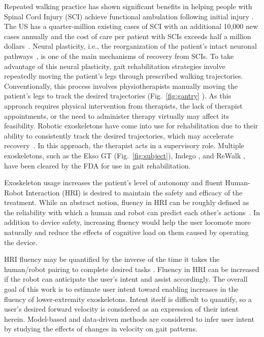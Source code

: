 Repeated walking practice has shown significant benefits in helping people with Spinal Cord Injury (SCI) achieve functional ambulation following initial injury \cite{lam2007systematic}. The US has a quarter-million existing cases of SCI with an additional 10,000 new cases annually \cite{nih} and the cost of care per patient with SCIs exceeds half a million dollars~\cite{devivo2011costs}. Neural plasticity, i.e., the reorganization of the patient's intact neuronal pathways~\cite{curt2008recovery}, is one of the main mechanisms of recovery from SCIs. To take advantage of this neural plasticity, gait rehabilitation strategies involve repeatedly moving the patient's legs through prescribed walking trajectories. Conventionally, this process involves physiotherapists manually moving the patient's legs to track the desired trajectories (Fig.~\ref{fig:gantry} \cite{gaitrehabgantry}). %
As this approach requires physical intervention from therapists, the lack of therapist appointments, or the need to administer therapy virtually may affect its feasibility. Robotic exoskeletons have come into use for rehabilitation due to their ability to consistently track the desired trajectories, which may accelerate recovery~\cite{hidler2011role}. In this approach, the therapist acts in a supervisory role. Multiple exoskeletons, such as the Ekso GT \cite{brenner2016exploring} (Fig.~\ref{fig:subject}), Indego \cite{sup2008design}, and ReWalk \cite{rewalk}, have been cleared by the FDA for use in gait rehabilitation.

Exoskeleton usage increases the patient's level of autonomy and fluent Human-Robot Interaction (HRI) is desired to maintain the safety and efficacy of the treatment. While an abstract notion, fluency in HRI can be roughly defined as the reliability with which a human and robot can predict each other's actions~\cite{hoffman2007cost}. In addition to device safety, increasing fluency would help the user locomote more naturally and reduce the effects of cognitive load \cite{bogen2018walk} on them caused by operating the device.

HRI fluency may be quantified by the inverse of the time it takes the human/robot pairing to complete desired tasks \cite{hoffman2019evaluating}. Fluency in HRI can be increased if the robot can anticipate the user's intent and assist accordingly. The overall goal of this work is to estimate user intent toward enabling increases in the fluency of lower-extremity exoskeletons. Intent itself is difficult to quantify, so a user's desired forward velocity is considered as an expression of their intent herein. Model-based and data-driven methods are considered to infer user intent by studying the effects of changes in velocity on gait patterns.

